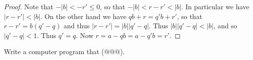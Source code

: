 \begin{proof}
Note that \(-|b| < -r' \leq 0\), so that \(-|b| < r-r' < |b|\).
In particular we have \(|r-r'| < |b|\).
On the other hand we have \(qb+r = q'b+r'\), so that \(r-r' = b(q'-q)\) and thus \(|r-r'| = |b||q'-q|\).
Thus \(|b||q'-q| < |b|\), and so \(|q'-q| < 1\).
Thus \(q' = q\).
Now \(r = a - qb = a - q'b = r'\).
\end{proof}



\Exercises%

\begin{exercise}
Write a computer program that (@@@).
\end{exercise}

